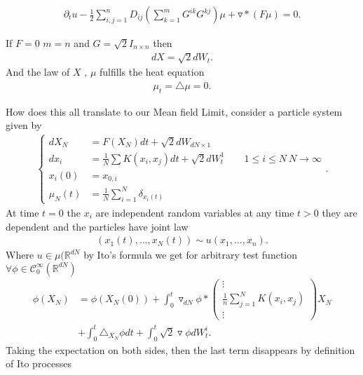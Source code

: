\begin{definition}
 \begin{align*}
   \partial_t u  - \frac{1}{2} \sum_{i,j=1}^{n}  D_{ij} (\sum_{k=1}^{m}  G^{ik}G^{kj}  )\mu  + \triangledown * (F \mu )  = 0 
 .\end{align*} 
\end{definition}
\begin{example}
  If $F=0$  $m=n$ and $G=\sqrt{2}I_{n \times  n} $ then 
  \begin{align*}
    dX = \sqrt{2} dW_t 
  .\end{align*}
  And the law of $X$ , $\mu $ fulfills the heat equation
  \begin{align*}
    \mu_t = \triangle \mu  = 0
  .\end{align*}
\end{example}
How does this all translate to our Mean field Limit, consider a particle system given  by 
\begin{align*}
  \begin{cases}  
  dX_N &= F(X_N) dt + \sqrt{2} dW_{dN \times 1} \\
  d x_i &=  \frac{1}{N} \sum K(x_i,x_j) dt + \sqrt{2} dW_t^1  \qquad 1\le i\le N \ N\to \infty\\
  x_i(0)    &= x_{0,i} \\
  \mu_N(t) &= \frac{1}{N} \sum_{i=1}^{N} \delta_{x_i(t)} 
  \end{cases}
.\end{align*}
At time $t = 0$ the $x_i$ are independent random variables at any time $t>0$ they are dependent and the particles have joint law 
\begin{align*}
  (x_{1}(t),\ldots ,x_N(t)) \sim  u(x_{1},\ldots ,x_n)
.\end{align*}
Where $u \in  \mu(\mathbb{R}^{dN}$ by Ito's formula we get for arbitrary test function $\forall  \phi  \in  \mathcal{C}_0^{\infty}(\mathbb{R}^{dN} ) $ 
\begin{align*}
  \phi(X_N) &=  \phi(X_N(0)) + \int_0^{t} \triangledown _{dN}\phi  *\begin{pmatrix} \vdots \\ \frac{1}{n} \sum_{j=1}^{N} K(x_i,x_j) \\ \vdots  \end{pmatrix}  X_N \\
            &+ \int_0^{t}  \triangle_{X_N} \phi  dt + \int_0^{t} \sqrt{2} \triangledown \phi  dW_t^{i} 
.\end{align*}
Taking the expectation on both sides, then the last term disappears by definition of Ito processes 
